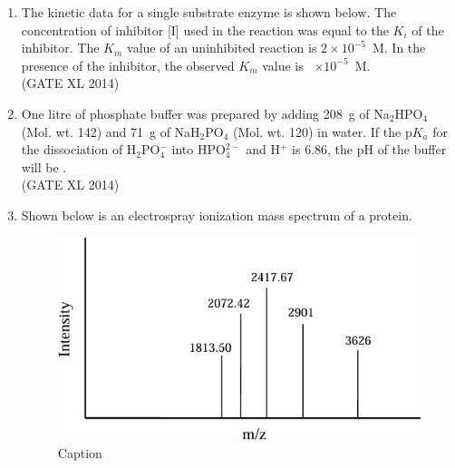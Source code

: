 \documentclass[journal,12pt,onecolumn]{IEEEtran}
\theoremstyle{remark}
\begin{document}
\begin{enumerate}
\item The kinetic data for a single substrate enzyme is shown below. The concentration of inhibitor [I] used in the reaction was equal to the $K_i$ of the inhibitor. The $K_m$ value of an uninhibited reaction is $2 \times 10^{-5}$~M. In the presence of the inhibitor, the observed $K_m$ value is \underline{\hspace{2cm}}~$\times 10^{-5}$~M.\\
\hfill (GATE XL 2014)\\
\item One litre of phosphate buffer was prepared by adding 208~g of Na$_2$HPO$_4$ (Mol. wt. 142) and 71~g of NaH$_2$PO$_4$ (Mol. wt. 120) in water. If the p$K_a$ for the dissociation of H$_2$PO$_4^-$ into HPO$_4^{2-}$ and H$^+$ is 6.86, the pH of the buffer will be \underline{\hspace{2cm}}.\\
\hfill (GATE XL 2014)\\
\item Shown below is an electrospray ionization mass spectrum of a protein. 
\begin{figure}[H]
    \centering
    \includegraphics[width=0.5\columnwidth]{fig26.png}
    \caption{Caption}
    \label{fig:placeholder}
\end{figure}


\end{enumerate}
\end{document}
